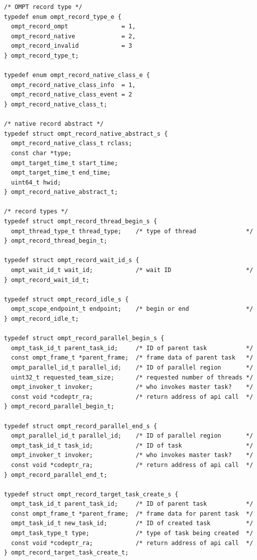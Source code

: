 \documentclass{article}
\begin{document}
\begin{verbatim}
/* OMPT record type */
typedef enum ompt_record_type_e {
  ompt_record_ompt               = 1,
  ompt_record_native             = 2,
  ompt_record_invalid            = 3
} ompt_record_type_t; 

typedef enum ompt_record_native_class_e {
  ompt_record_native_class_info  = 1,
  ompt_record_native_class_event = 2
} ompt_record_native_class_t;

/* native record abstract */
typedef struct ompt_record_native_abstract_s {
  ompt_record_native_class_t rclass;
  const char *type;
  ompt_target_time_t start_time;
  ompt_target_time_t end_time;
  uint64_t hwid;
} ompt_record_native_abstract_t;

/* record types */
typedef struct ompt_record_thread_begin_s {
  ompt_thread_type_t thread_type;    /* type of thread              */
} ompt_record_thread_begin_t;

typedef struct ompt_record_wait_id_s {
  ompt_wait_id_t wait_id;            /* wait ID                     */
} ompt_record_wait_id_t;

typedef struct ompt_record_idle_s {
  ompt_scope_endpoint_t endpoint;    /* begin or end                */
} ompt_record_idle_t;

typedef struct ompt_record_parallel_begin_s {
  ompt_task_id_t parent_task_id;     /* ID of parent task           */
  const ompt_frame_t *parent_frame;  /* frame data of parent task   */
  ompt_parallel_id_t parallel_id;    /* ID of parallel region       */
  uint32_t requested_team_size;      /* requested number of threads */
  ompt_invoker_t invoker;            /* who invokes master task?    */
  const void *codeptr_ra;            /* return address of api call  */ 
} ompt_record_parallel_begin_t;

typedef struct ompt_record_parallel_end_s {
  ompt_parallel_id_t parallel_id;    /* ID of parallel region       */
  ompt_task_id_t task_id;            /* ID of task                  */
  ompt_invoker_t invoker;            /* who invokes master task?    */
  const void *codeptr_ra;            /* return address of api call  */ 
} ompt_record_parallel_end_t;

typedef struct ompt_record_target_task_create_s {
  ompt_task_id_t parent_task_id;     /* ID of parent task           */
  const ompt_frame_t *parent_frame;  /* frame data for parent task  */
  ompt_task_id_t new_task_id;        /* ID of created task          */
  ompt_task_type_t type;             /* type of task being created  */ 
  const void *codeptr_ra;            /* return address of api call  */ 
} ompt_record_target_task_create_t;


\end{verbatim}
\end{document}
